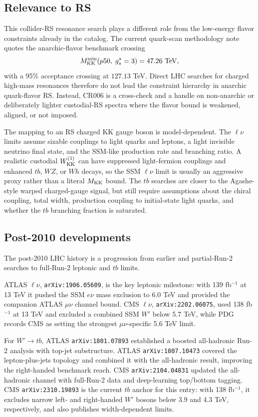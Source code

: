\subsection*{Relevance to RS}
This collider-RS resonance search plays a different role from the low-energy
flavor constraints already in the catalog.  The current quark-scan
methodology note quotes the
anarchic-flavor benchmark crossing
\[
  M_{\rm KK}^{\min}(p50,\; g_s^\star=3) = 47.26~{\rm TeV},
\]
with a 95\% acceptance crossing at \(127.13\) TeV.  Direct LHC searches for
charged high-mass resonances therefore do not lead the constraint hierarchy
in anarchic quark-flavor RS.  Instead, CR006 is a cross-check and a handle on
non-anarchic or deliberately lighter custodial-RS spectra where the flavor
bound is weakened, aligned, or not imposed.

The mapping to an RS charged KK gauge boson is model-dependent.  The
\(\ell\nu\) limits assume sizable couplings to light quarks and leptons, a
light invisible neutrino final state, and the SSM-like production rate and
branching ratio.  A realistic custodial \(W^{(1)}_{\rm KK}\) can have
suppressed light-fermion couplings and enhanced \(tb\), \(WZ\), or \(Wh\)
decays, so the SSM \(\ell\nu\) limit is usually an aggressive proxy rather
than a literal \(M_{\rm KK}\) bound.  The \(tb\) searches are closer to the
Agashe-style warped charged-gauge signal, but still require assumptions about
the chiral coupling, total width, production coupling to initial-state light
quarks, and whether the \(tb\) branching fraction is saturated.

\subsection*{Post-2010 developments}
The post-2010 LHC history is a progression from earlier and partial-Run-2
searches to full-Run-2 leptonic and \(tb\) limits.

ATLAS \(\ell\nu\), \texttt{arXiv:1906.05609}, is the key leptonic milestone:
with 139 fb\(^{-1}\) at 13 TeV it pushed the SSM \(e\nu\) mass exclusion to
6.0 TeV and provided the companion ATLAS \(\mu\nu\) channel bound.  CMS \(\ell\nu\),
\texttt{arXiv:2202.06075}, used 138 fb\(^{-1}\) at 13 TeV and excluded a
combined SSM \(W'\) below 5.7 TeV, while PDG records CMS as setting the
strongest \(\mu\nu\)-specific 5.6 TeV limit.

For \(W'\to tb\), ATLAS \texttt{arXiv:1801.07893} established a boosted
all-hadronic Run-2 analysis with top-jet substructure.  ATLAS
\texttt{arXiv:1807.10473} covered the lepton-plus-jets topology and combined
it with the all-hadronic result, improving the right-handed benchmark reach.
CMS \texttt{arXiv:2104.04831} updated the all-hadronic channel with full-Run-2
data and deep-learning top/bottom tagging.  CMS
\texttt{arXiv:2310.19893} is the current \(tb\) anchor for this entry: with
138 fb\(^{-1}\), it excludes narrow left- and right-handed \(W'\) bosons below
3.9 and 4.3 TeV, respectively, and also publishes width-dependent limits.

